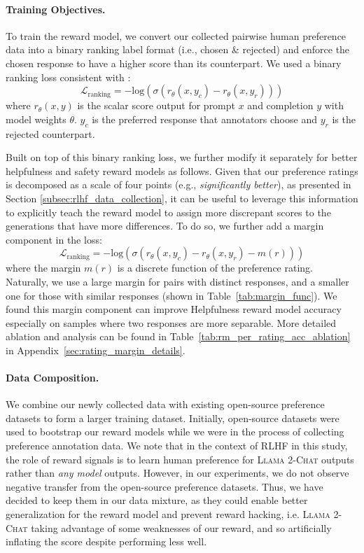 \documentclass{article}
\newcommand{\modelname}{\textsc{Llama 2-Chat}\xspace}
\begin{document}
\paragraph{Training Objectives.} 
To train the reward model, we convert our collected pairwise human preference data into a binary ranking label format (i.e., chosen \& rejected) and enforce the chosen response to have a higher score than its counterpart.
We used a binary ranking loss consistent with \cite{ouyang2022training}:
\begin{equation}
\mathcal{L}_{\text{ranking}} = -\text{log}(\sigma(r_\theta(x,y_{c}) - r_\theta(x,y_{r})))
\label{eq:rating_loss_default}
\end{equation}
where $r_\theta(x, y)$ is the scalar score output for prompt $x$ and completion $y$ with model weights $\theta$. $y_{c}$ is the preferred response that annotators choose and $y_{r}$ is the rejected counterpart. 

Built on top of this binary ranking loss, we further modify it separately for better helpfulness and safety reward models as follows. Given that our preference ratings is decomposed as a scale of four points (e.g., \textit{significantly better}), as presented in Section \ref{subsec:rlhf_data_collection}, it can be useful to leverage this information to explicitly teach the reward model to assign more discrepant scores to the generations that have more differences.
To do so, we further add a margin component in the loss:
\begin{equation}
\mathcal{L}_{\text{ranking}} = -\text{log}(\sigma(r_\theta(x,y_{c}) - r_\theta(x,y_{r}) - m(r)))
\label{eq:rating_loss}
\end{equation}
where the margin $m(r)$ is a discrete function of the preference rating.  Naturally, we use a large margin for pairs with distinct responses, and a smaller one for those with similar responses (shown in Table~\ref{tab:margin_func}).
We found this margin component can improve Helpfulness reward model accuracy especially on samples where two responses are more separable.
More detailed ablation and analysis can be found in Table~\ref{tab:rm_per_rating_acc_ablation} in Appendix~\ref{sec:rating_margin_details}.

\paragraph{Data Composition.}
We combine our newly collected data with existing open-source preference datasets to form a larger training dataset. Initially, open-source datasets were used to bootstrap our reward models while we were in the process of collecting preference annotation data. We note that in the context of RLHF in this study, the role of reward signals is to learn human preference for \modelname outputs rather than \emph{any model} outputs. However, in our experiments, we do not observe negative transfer from the open-source preference datasets. Thus, we have decided to keep them in our data mixture, as they could enable better generalization for the reward model and prevent reward hacking, i.e. \modelname{} taking advantage of some weaknesses of our reward, and so artificially inflating the score despite performing less well. 
\end{document}
